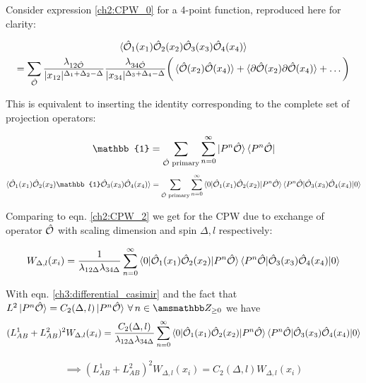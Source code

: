 Consider expression \ref{ch2:CPW_0} for a 4-point function, reproduced here for clarity:

\begin{multline}
 \braket{ \hat{\mathcal{{O}}}_1(x_1) \hat{\mathcal{{O}}}_2(x_2) \hat{\mathcal{{O}}}_3(x_3) \hat{\mathcal{{O}}}_4(x_4)} \\ =  \sum_{\hat{\mathcal{{O}}}}  \frac{\lambda_{12\hat{\mathcal{{O}}}}}{|x_{12}|^{\Delta_1+\Delta_2-\Delta}} \frac{\lambda_{34\hat{\mathcal{{O}}}}}{|x_{34}|^{\Delta_3+\Delta_4-\Delta}} \bigg( \braket{\hat{\mathcal{{O}}}(x_2)\hat{\mathcal{{O}}}(x_4)}+\braket{\partial \hat{\mathcal{{O}}}(x_2) \partial \hat{\mathcal{{O}}}(x_4)}+\dots \bigg)
\end{multline}

This is equivalent to inserting the identity corresponding to the complete set of projection operators:

\begin{align}
 \mathbb{1} = \sum_{\op{O} \text{ primary}} \sum_{n=0}^\infty \ket{P^n \op{O}}\bra{P^n \op{O}}
\end{align}
\begin{multline}
 \braket{ \op{O}_1(x_1) \op{O}_2(x_2) \mathbb{1}  \op{O}_3(x_3) \op{O}_4(x_4)} = \sum_{\op{O} \text{ primary}} \sum_{n=0}^\infty \braket{0| \op{O}_1(x_1) \op{O}_2(x_2)|P^n \op{O}}  \braket{P^n \op{O}| \op{O}_3(x_3) \op{O}_4(x_4)|0}
\end{multline}

Comparing to eqn. \ref{ch2:CPW_2} we get for the CPW due to exchange of operator $\hat{\mathcal{{O}}}$ with scaling dimension and spin $\Delta, l$ respectively:

\begin{align}
 W_{\Delta,l}(x_i) = \frac{1}{\lambda_{12\Delta} \lambda_{34\Delta}} \sum_{n=0}^\infty \braket{0| \hat{\mathcal{{O}}}_1(x_1) \hat{\mathcal{{O}}}_2(x_2)|P^n \hat{\mathcal{{O}}}}  \braket{P^n \hat{\mathcal{{O}}}| \hat{\mathcal{{O}}}_3(x_3) \hat{\mathcal{{O}}}_4(x_4)|0}
\end{align}

With eqn. \ref{ch3:differential_casimir} and the fact that $L^2 \ket{P^n \op{O}} = C_2(\Delta,l)\ket{P^n \op{O}} \, \forall \, n \in \amsmathbb Z_{\ge 0}$ we have
\begin{align}
 (L_{AB}^1+L_{AB}^2)^2 W_{\Delta,l}(x_i) = \frac{C_2(\Delta,l)}{\lambda_{12\Delta} \lambda_{34\Delta}} \sum_{n=0}^\infty \braket{0| \hat{\mathcal{{O}}}_1(x_1) \hat{\mathcal{{O}}}_2(x_2)|P^n \hat{\mathcal{{O}}}}  \braket{P^n \hat{\mathcal{{O}}}| \hat{\mathcal{{O}}}_3(x_3) \hat{\mathcal{{O}}}_4(x_4)|0}
\end{align}

\begin{align}
 \implies (L_{AB}^1+L_{AB}^2)^2 W_{\Delta,l}(x_i) = C_2(\Delta,l) W_{\Delta,l}(x_i) 
\end{align}

